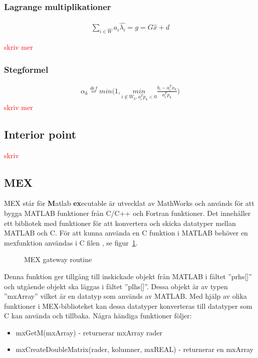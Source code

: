 \subsubsection{Lagrange multiplikationer}

\begin{equation*}
\begin{aligned}
\sum_{i \in \hat{W}} a_i \hat{\lambda_i} = g = G \hat{x} + d
\end{aligned}
\end{equation*}

\textcolor{red}{skriv mer}

\subsubsection{Stegformel}
\begin{equation*}
\begin{aligned}
\alpha_k\overset{def}{=}min \bigg(1,\underset{i\notin W_k,a_i^Tp_k<0}{min} \frac{b_i-a_i^Tx_k}{a_i^Tp_k} \bigg)
\end{aligned}
\end{equation*}
\textcolor{red}{skriv mer}

\subsection{Interior point}
\textcolor{red}{skriv}

\subsection{MEX}
\label{sec:mex}
MEX står för \textbf{M}atlab \textbf{ex}ecutable är utvecklat av MathWorks och används för att bygga MATLAB funktioner från C/C++ och Fortran funktioner. Det innehåller ett bibliotek med funktioner för att konvertera och skicka datatyper mellan MATLAB och C. För att kunna använda en C funktion i MATLAB behöver en mexfunktion användas i C filen \citep{mathworks}, se figur~\ref{fig:mex}. 

\begin{figure}[H]

\caption{MEX gateway routine}
\label{fig:mex}
\end{figure}  

Denna funktion ger tillgång till inskickade objekt från MATLAB i fältet ''prhs[]'' och utgående objekt ska läggas i fältet ''plhs[]''. Dessa objekt är av typen ''mxArray'' vilket är en datatyp som används av MATLAB. Med hjälp av olika funktioner i MEX-biblioteket kan dessa datatyper konverteras till datatyper som C kan använda och tillbaka\citep{mathworks}. Några händiga funktioner följer:
\begin{itemize}
\item mxGetM(mxArray) - returnerar mxArray rader
\item mxCreateDoubleMatrix(rader, kolumner, mxREAL) - returnerar en mxArray
\end{itemize}

